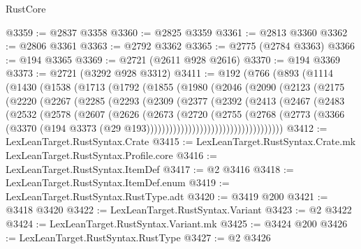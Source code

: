 \begin{lexlean}{RustCore}
\begin{coremodule}
@3359 := @2837 @3358
@3360 := @2825 @3359
@3361 := @2813 @3360
@3362 := @2806 @3361
@3363 := @2792 @3362
@3365 := @2775 (@2784 @3363)
@3366 := @194 @3365
@3369 := @2721 (@2611 @928 @2616)
@3370 := @194 @3369
@3373 := @2721 (@3292 @928 @3312)
@3411 := @192
    (@766
      (@893
        (@1114
          (@1430
            (@1538
              (@1713
                (@1792
                  (@1855
                    (@1980
                      (@2046
                        (@2090
                          (@2123
                            (@2175
                              (@2220
                                (@2267
                                  (@2285
                                    (@2293
                                      (@2309
                                        (@2377
                                          (@2392
                                            (@2413
                                              (@2467
                                                (@2483
                                                  (@2532
                                                    (@2578
                                                      (@2607
                                                        (@2626
                                                          (@2673
                                                            (@2720
                                                              (@2755
                                                                (@2768
                                                                  (@2773
                                                                    (@3366
                                                                      (@3370
                                                                        (@194
                                                                          @3373
                                                                          (@29
                                                                            @193))))))))))))))))))))))))))))))))))))
@3412 := LexLeanTarget.RustSyntax.Crate
@3415 := LexLeanTarget.RustSyntax.Crate.mk LexLeanTarget.RustSyntax.Profile.core
@3416 := LexLeanTarget.RustSyntax.ItemDef
@3417 := @2 @3416
@3418 := LexLeanTarget.RustSyntax.ItemDef.enum
@3419 := LexLeanTarget.RustSyntax.RustType.adt
@3420 := @3419 @200
@3421 := @3418 @3420
@3422 := LexLeanTarget.RustSyntax.Variant
@3423 := @2 @3422
@3424 := LexLeanTarget.RustSyntax.Variant.mk
@3425 := @3424 @200
@3426 := LexLeanTarget.RustSyntax.RustType
@3427 := @2 @3426

\end{coremodule}
\end{lexlean}
